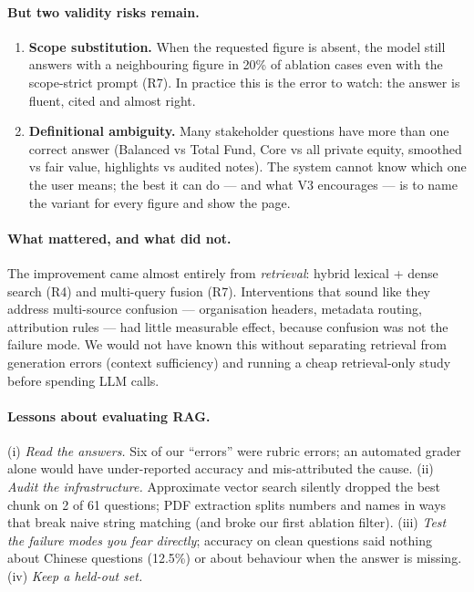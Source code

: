 \documentclass[11pt,a4paper]{article}
\begin{document}
\paragraph{But two validity risks remain.}
\begin{enumerate}
  \item \textbf{Scope substitution.} When the requested figure is absent, the model still answers with a neighbouring
        figure in 20\% of ablation cases even with the scope-strict prompt (R7). In practice this is the error to
        watch: the answer is fluent, cited and almost right.
  \item \textbf{Definitional ambiguity.} Many stakeholder questions have more than one correct answer (Balanced vs
        Total Fund, Core vs all private equity, smoothed vs fair value, highlights vs audited notes). The system
        cannot know which one the user means; the best it can do --- and what V3 encourages --- is to name the variant
        for every figure and show the page.
\end{enumerate}

\paragraph{What mattered, and what did not.} The improvement came almost entirely from \emph{retrieval}: hybrid
lexical + dense search (R4) and multi-query fusion (R7). Interventions that sound like they address multi-source
confusion --- organisation headers, metadata routing, attribution rules --- had little measurable effect, because
confusion was not the failure mode. We would not have known this without separating retrieval from generation errors
(context sufficiency) and running a cheap retrieval-only study before spending LLM calls.

\paragraph{Lessons about evaluating RAG.}
(i) \emph{Read the answers.} Six of our ``errors'' were rubric errors; an automated grader alone would have
under-reported accuracy and mis-attributed the cause. (ii) \emph{Audit the infrastructure.} Approximate vector
search silently dropped the best chunk on 2 of 61 questions; PDF extraction splits numbers and names in ways that
break naive string matching (and broke our first ablation filter). (iii) \emph{Test the failure modes you fear
directly}; accuracy on clean questions said nothing about Chinese questions (12.5\%) or about behaviour when the answer
is missing. (iv) \emph{Keep a held-out set.}
\end{document}
